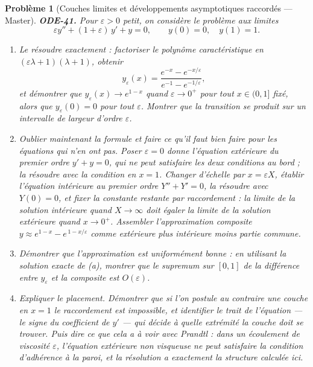 \documentclass[11pt]{article}
\newtheorem{problem}{Problème}
\begin{document}
\begin{problem}[{Couches limites et développements asymptotiques raccordés --- Master}]
\textbf{ODE-41.} Pour $ \varepsilon > 0 $ petit, on considère le problème aux limites
\[ \varepsilon y'' + (1 + \varepsilon)\,y' + y = 0, \qquad y(0) = 0, \quad y(1) = 1 . \]
\begin{enumerate}
\item[(a)] Le résoudre exactement : factoriser le polynôme caractéristique en
$ (\varepsilon \lambda + 1)(\lambda + 1) $, obtenir
\[ y_\varepsilon(x) = \frac{e^{-x} - e^{-x/\varepsilon}}{e^{-1} - e^{-1/\varepsilon}}, \]
et démontrer que $ y_\varepsilon(x) \to e^{1-x} $ quand $ \varepsilon \to 0^{+} $ pour tout
$ x \in (0,1] $ fixé, alors que $ y_\varepsilon(0) = 0 $ pour tout $ \varepsilon $. Montrer
que la transition se produit sur un intervalle de largeur d'ordre $ \varepsilon $.
\item[(b)] Oublier maintenant la formule et faire ce qu'il faut bien faire pour les équations qui n'en
ont pas. Poser $ \varepsilon = 0 $ donne l'équation \textit{extérieure} du premier ordre
$ y' + y = 0 $, qui ne peut satisfaire les deux conditions au bord ; la résoudre avec la
condition en $ x = 1 $. Changer d'échelle par $ x = \varepsilon X $, établir l'équation
\textit{intérieure} au premier ordre $ Y'' + Y' = 0 $, la résoudre avec $ Y(0) = 0 $, et fixer la
constante restante par raccordement : la limite de la solution intérieure quand
$ X \to \infty $ doit égaler la limite de la solution extérieure quand $ x \to 0^{+} $.
Assembler l'approximation composite $ y \approx e^{1-x} - e^{\,1 - x/\varepsilon} $ comme
extérieure plus intérieure moins partie commune.
\item[(c)] Démontrer que l'approximation est uniformément bonne : en utilisant la solution exacte de
(a), montrer que le supremum sur $ [0,1] $ de la différence entre $ y_\varepsilon $ et la
composite est $ O(\varepsilon) $.
\item[(d)] Expliquer le placement. Démontrer que si l'on postule au contraire une couche en $ x = 1 $
le raccordement est impossible, et identifier le trait de l'équation --- le signe du coefficient de
$ y' $ --- qui décide à quelle extrémité la couche doit se trouver. Puis dire ce que cela a à voir
avec Prandtl : dans un écoulement de viscosité $ \varepsilon $, l'équation extérieure non
visqueuse ne peut satisfaire la condition d'adhérence à la paroi, et la résolution a exactement la
structure calculée ici.
\end{enumerate}

\end{problem}
\end{document}
